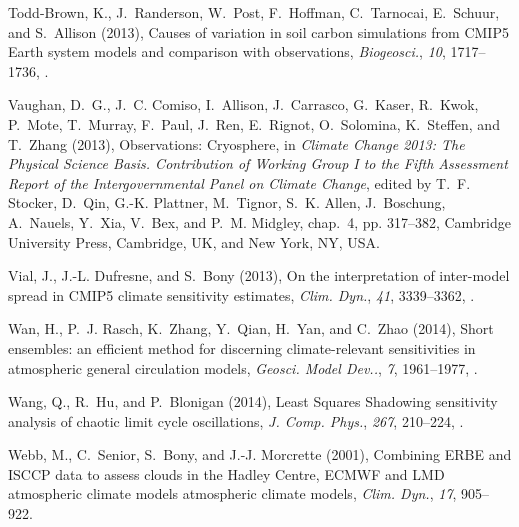 \documentclass[draft]{agujournal}
\begin{document}
\begin{thebibliography}{196}
Todd-Brown, K., J.~Randerson, W.~Post, F.~Hoffman, C.~Tarnocai, E.~Schuur, and
  S.~Allison (2013), Causes of variation in soil carbon simulations from
  {CMIP5} {E}arth system models and comparison with observations,
  \textit{Biogeosci.}, \textit{10}, 1717--1736, .

Vaughan, D.~G., J.~C. Comiso, I.~Allison, J.~Carrasco, G.~Kaser, R.~Kwok,
  P.~Mote, T.~Murray, F.~Paul, J.~Ren, E.~Rignot, O.~Solomina, K.~Steffen, and
  T.~Zhang (2013), Observations: Cryosphere, in \textit{Climate Change 2013:
  The Physical Science Basis. Contribution of Working Group I to the Fifth
  Assessment Report of the Intergovernmental Panel on Climate Change}, edited
  by T.~F. Stocker, D.~Qin, G.-K. Plattner, M.~Tignor, S.~K. Allen,
  J.~Boschung, A.~Nauels, Y.~Xia, V.~Bex, and P.~M. Midgley, chap.~4, pp.
  317--382, Cambridge University Press, Cambridge, UK, and New York, NY, USA.

Vial, J., J.-L. Dufresne, and S.~Bony (2013), On the interpretation of
  inter-model spread in {CMIP5} climate sensitivity estimates, \textit{Clim.
  Dyn.}, \textit{41}, 3339--3362, .

Wan, H., P.~J. Rasch, K.~Zhang, Y.~Qian, H.~Yan, and C.~Zhao (2014), Short
  ensembles: an efficient method for discerning climate-relevant sensitivities
  in atmospheric general circulation models, \textit{Geosci. Model Dev..},
  \textit{7}, 1961--1977, .

Wang, Q., R.~Hu, and P.~Blonigan (2014), Least {S}quares {S}hadowing
  sensitivity analysis of chaotic limit cycle oscillations, \textit{J. Comp.
  Phys.}, \textit{267}, 210--224, .

Webb, M., C.~Senior, S.~Bony, and J.-J. Morcrette (2001), Combining {ERBE} and
  {ISCCP} data to assess clouds in the {H}adley {C}entre, {ECMWF} and {LMD}
  atmospheric climate models atmospheric climate models, \textit{Clim. Dyn.},
  \textit{17}, 905--922.


\end{thebibliography}
\end{document}
